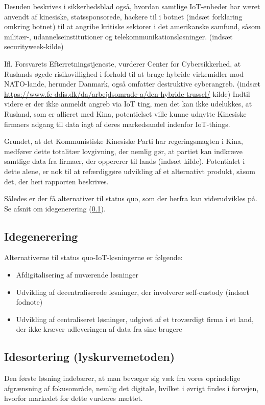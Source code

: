 \documentclass[11pt]{article}
\begin{document}
Desuden beskrives i sikkerhedsblad også, hvordan samtlige IoT-enheder har været anvendt af kinesiske, statssponsorede, hackere til i botnet (indsæt forklaring omkring botnet) til at angribe kritiske sektorer i det amerikanske samfund, såsom militær-, udannelseinstitutioner og telekommunikationsløsninger. (indsæt securityweek-kilde)

Ifl. Forsvarets Efterretningstjeneste, vurderer Center for Cybersikkerhed, at Ruslands øgede risikovillighed i forhold til at bruge hybride virkemidler mod NATO-lande, herunder Danmark, også omfatter destruktive cyberangreb. (indsæt \url{https://www.fe-ddis.dk/da/arbejdsomrade-a/den-hybride-trussel/} kilde) Indtil videre er der ikke anmeldt angreb via IoT ting, men det kan ikke udelukkes, at Rusland, som er allieret med Kina, potentielset ville kunne udnytte Kinesiske firmaers adgang til data iagt af deres markedsandel indenfor IoT-things.

Grundet, at det Kommunistiske Kinesiske Parti har regeringsmagten i Kina, medfører dette totalitær lovgivning, der nemlig gør, at partiet kan indkræve samtlige data fra firmaer, der oppererer til lands (indsæt kilde). Potentialet i dette alene, er nok til at refærdiggøre udvikling af et alternativt produkt, såsom det, der heri rapporten beskrives.

Således er der få alternativer til status quo, som der herfra kan viderudvikles på. Se afsnit om idegenerering (\ref{sec:org12d3e0c}).
\subsection{Idegenerering}
\label{sec:org12d3e0c}
Alternativerne til status quo-IoT-løsningerne er følgende:
\begin{itemize}
\item Afdigitalisering af nuværende løsninger
\item Udvikling af decentraliserede løsninger, der involverer self-custody (indsæt fodnote)
\item Udvikling af centraliseret løsninger, udgivet af et troværdigt firma i et land, der ikke kræver udleveringen af data fra sine brugere
\end{itemize}
\subsection{Idesortering (lyskurvemetoden)}
\label{sec:orgb65406b}
Den første løsning indebærer, at man bevæger sig væk fra vores oprindelige afgrænsning af fokusområde, nemlig det digitale, hvilket i øvrigt findes i forvejen, hvorfor markedet for dette vurderes mættet.
\end{document}
